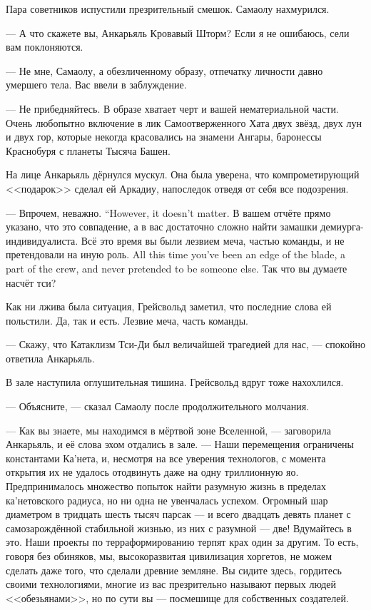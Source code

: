 Пара советников испустили презрительный смешок.
Самаолу нахмурился.

--- А что скажете вы, Анкарьяль Кровавый Шторм?
Если я не ошибаюсь, сели вам поклоняются.

--- Не мне, Самаолу, а обезличенному образу, отпечатку личности давно умершего тела.
Вас ввели в заблуждение.

--- Не прибедняйтесь.
В образе хватает черт и вашей нематериальной части.
Очень любопытно включение в лик Самоотверженного Хата двух звёзд, двух лун и двух гор, которые некогда красовались на знамени Ангары, баронессы Краснобуря с планеты Тысяча Башен.

На лице Анкарьяль дёрнулся мускул.
Она была уверена, что компрометирующий <<подарок>> сделал ей Аркадиу, напоследок отведя от себя все подозрения.

{--- Впрочем, неважно.}
{``However, it doesn't matter.}
В вашем отчёте прямо указано, что это совпадение, а в вас достаточно сложно найти замашки демиурга-индивидуалиста.
{Всё это время вы были лезвием меча, частью команды, и не претендовали на иную роль.}
{All this time you've been an edge of the blade, a part of the crew, and never pretended to be someone else.}
Так что вы думаете насчёт тси?

Как ни лжива была ситуация, Грейсвольд заметил, что последние слова ей польстили.
Да, так и есть.
Лезвие меча, часть команды.

--- Скажу, что Катаклизм Тси-Ди был величайшей трагедией для нас, --- спокойно ответила Анкарьяль.

В зале наступила оглушительная тишина.
Грейсвольд вдруг тоже нахохлился.

--- Объясните, --- сказал Самаолу после продолжительного молчания.

--- Как вы знаете, мы находимся в мёртвой зоне Вселенной, --- заговорила Анкарьяль, и её слова эхом отдались в зале.
--- Наши перемещения ограничены константами Ка'нета, и, несмотря на все уверения технологов, с момента открытия их не удалось отодвинуть даже на одну триллионную яо.
Предпринималось множество попыток найти разумную жизнь в пределах ка'нетовского радиуса, но ни одна не увенчалась успехом.
Огромный шар диаметром в тридцать шесть тысяч парсак --- и всего двадцать девять планет с самозарождённой стабильной жизнью, из них с разумной --- две!
Вдумайтесь в это.
Наши проекты по терраформированию терпят крах один за другим.
То есть, говоря без обиняков, мы, высокоразвитая цивилизация хоргетов, не можем сделать даже того, что сделали древние земляне.
Вы сидите здесь, гордитесь своими технологиями, многие из вас презрительно называют первых людей <<обезьянами>>, но по сути вы --- посмешище для собственных создателей.

